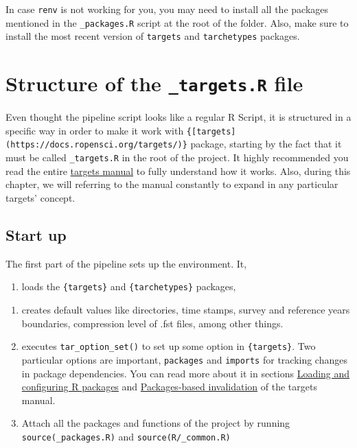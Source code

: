 \documentclass[
]{book}
\providecommand{\tightlist}{%
  \setlength{\itemsep}{0pt}\setlength{\parskip}{0pt}}
\begin{document}
In case \texttt{renv} is not working for you, you may need to install all the packages
mentioned in the \texttt{\_packages.R} script at the root of the folder. Also, make sure
to install the most recent version of \texttt{targets} and \texttt{tarchetypes} packages.

\hypertarget{structure-of-the-_targets.r-file}{%
\section{\texorpdfstring{Structure of the \texttt{\_targets.R} file}{Structure of the \_targets.R file}}\label{structure-of-the-_targets.r-file}}

Even thought the pipeline script looks like a regular R Script, it is structured
in a specific way in order to make it work with
\texttt{\{{[}targets{]}(https://docs.ropensci.org/targets/)\}} package, starting by the fact
that it must be called \texttt{\_targets.R} in the root of the project. It highly
recommended you read the entire \href{https://books.ropensci.org/targets/}{targets
manual} to fully understand how it works.
Also, during this chapter, we will referring to the manual constantly to expand
in any particular targets' concept.

\hypertarget{start-up}{%
\subsection*{Start up}\label{start-up}}

The first part of the pipeline sets up the environment. It,

\begin{enumerate}
\def\labelenumi{\arabic{enumi}.}
\tightlist
\item
  loads the \texttt{\{targets\}} and \texttt{\{tarchetypes\}} packages,
\end{enumerate}

\begin{enumerate}
\def\labelenumi{\arabic{enumi}.}
\setcounter{enumi}{1}
\tightlist
\item
  creates default values like directories, time stamps, survey and reference
  years boundaries, compression level of .fst files, among other things.
\item
  executes \texttt{tar\_option\_set()} to set up some option in \texttt{\{targets\}}. Two
  particular options are important, \texttt{packages} and \texttt{imports} for tracking
  changes in package dependencies. You can read more about it in sections
  \href{https://books.ropensci.org/targets/practices.html\#loading-and-configuring-r-packages}{Loading and configuring R
  packages}
  and \href{https://books.ropensci.org/targets/practices.html\#packages-based-invalidation}{Packages-based
  invalidation}
  of the targets manual.
\item
  Attach all the packages and functions of the project by running
  \texttt{source(\textquotesingle{}\_packages.R\textquotesingle{})} and \texttt{source(\textquotesingle{}R/\_common.R\textquotesingle{})}
\end{enumerate}
\end{document}
